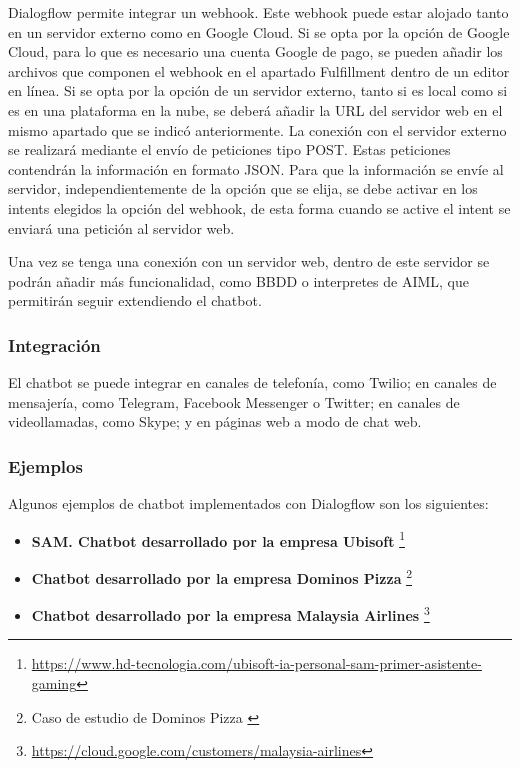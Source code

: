 Dialogflow permite integrar un \gls{webhook}. Este \gls{webhook} puede estar alojado tanto en un servidor externo como en Google Cloud. Si se opta por la opción de Google Cloud, para lo que es necesario una cuenta Google de pago, se pueden añadir los archivos que componen el \gls{webhook} en el apartado Fulfillment dentro de un editor en línea. Si se opta por la opción de un servidor externo, tanto si es local como si es en una plataforma en la nube, se deberá añadir la URL del servidor web en el mismo apartado que se indicó anteriormente. La conexión con el servidor externo se realizará mediante el envío de peticiones tipo POST. Estas peticiones contendrán la información en formato JSON. Para que la información se envíe al servidor, independientemente de la opción que se elija, se debe activar en los intents elegidos la opción del \gls{webhook}, de esta forma cuando se active el intent se enviará una petición al servidor web.

Una vez se tenga una conexión con un servidor web, dentro de este servidor se podrán añadir más funcionalidad, como BBDD o interpretes de AIML, que permitirán seguir extendiendo el chatbot.

\subsubsection*{Integración}

El chatbot se puede integrar en canales de telefonía, como Twilio; en canales de mensajería, como Telegram, Facebook Messenger o Twitter; en canales de videollamadas, como Skype; y en páginas web a modo de chat web.

\subsubsection*{Ejemplos}

Algunos ejemplos de chatbot implementados con Dialogflow son los siguientes:

\begin{itemize}
\item \textbf{SAM. Chatbot desarrollado por la empresa Ubisoft} \footnote{\url{https://www.hd-tecnologia.com/ubisoft-ia-personal-sam-primer-asistente-gaming}}
\item \textbf{Chatbot desarrollado por la empresa Dominos Pizza} \footnote{Caso de estudio de Dominos Pizza \cite{RefWorks:RefID:10-domino's-case-study}}
\item \textbf{Chatbot desarrollado por la empresa Malaysia Airlines} \footnote{\url{https://cloud.google.com/customers/malaysia-airlines}}
\end{itemize}


